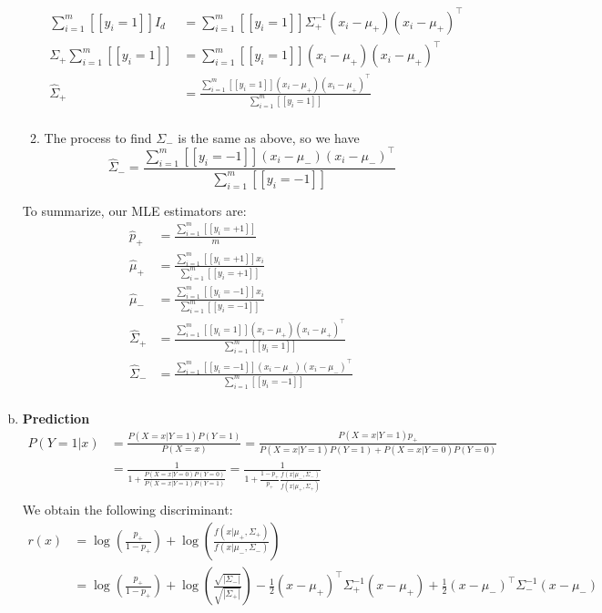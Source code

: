 \documentclass{amsart}
\theoremstyle{definition}
\begin{document}
\begin{enumerate}[(a)]
\begin{enumerate}
\begin{align*}
			\sum_{i=1}^{m}[[y_i = 1]]I_d &= \sum_{i=1}^{m} [[y_i = 1]]\Sigma_+^{-1}(x_i - \mu_+) (x_i-\mu_+)^\intercal\\
			\Sigma_+\sum_{i=1}^{m}[[y_i=1]] &= \sum_{i=1}^{m} [[y_i = 1]](x_i - \mu_+) (x_i-\mu_+)^\intercal\\
			\hat{\Sigma}_+ &= \frac{\sum_{i=1}^{m} [[y_i = 1]](x_i - \mu_+) (x_i-\mu_+)^\intercal}{\sum_{i=1}^{m}[[y_i = 1]]}\\
			\end{align*}
			\item The process to find $\Sigma_-$ is the same as above, so we have
			\[\hat{\Sigma}_- = \frac{\sum_{i=1}^{m}[[y_i = -1]] (x_i - \mu_-) (x_i-\mu_-)^\intercal}{\sum_{i=1}^{m}[[y_i = -1]]}\]
        \end{enumerate}
		To summarize, our MLE estimators are:
		\begin{align*}
			\hat{p}_+ &= \frac{\sum_{i=1}^{m}[[y_i = +1]]}{m}\\
			\hat{\mu}_+ &= \frac{\sum_{i=1}^{m}[[y_i = +1]] x_i}{\sum_{i=1}^{m}[[y_i = +1]]}\\
			\hat{\mu}_- &= \frac{\sum_{i=1}^{m}[[y_i = -1]] x_i}{\sum_{i=1}^{m}[[y_i = -1]]}\\
			\hat{\Sigma}_+ &= \frac{\sum_{i=1}^{m} [[y_i = 1]](x_i - \mu_+) (x_i-\mu_+)^\intercal}{\sum_{i=1}^{m}[[y_i = 1]]}\\
			\hat{\Sigma}_- &= \frac{\sum_{i=1}^{m}[[y_i = -1]] (x_i - \mu_-) (x_i-\mu_-)^\intercal}{\sum_{i=1}^{m}[[y_i = -1]]}\\
		\end{align*}
	\item {\bf Prediction}
		\begin{align*}
			P(Y = 1|x) &= \frac{P(X = x| Y= 1)P(Y=1)}{P(X = x)} = \frac{P(X = x|Y=1)p_+}{P(X=x|Y = 1)P(Y=1) + P(X = x|Y = 0)P(Y = 0)}\\
			&= \frac{1}{1 + \frac{P(X = x| Y = 0)P(Y = 0)}{P(X=x|Y=1)P(Y = 1)}} = \frac{1}{1 + \frac{1-p_+}{p_+}\frac{f(x|\mu_-, \Sigma_-)}{f(x|\mu_+, \Sigma_+)}}\\
		\end{align*}
		We obtain the following discriminant:
		\begin{align*}
			r(x) &= \log\left(\frac{p_+}{1-p_+}\right) + \log\left(\frac{f(x|\mu_+, \Sigma_+)}{f(x|\mu_-, \Sigma_-)}\right) \\
			&= \log\left(\frac{p_+}{1-p_+}\right) + \log\left(\frac{\sqrt{|\Sigma_-|}}{\sqrt{|\Sigma_+|}} \right) -\frac{1}{2}(x - \mu_+)^\intercal \Sigma_+^{-1}(x - \mu_+) + \frac12(x - \mu_-)^\intercal \Sigma_-^{-1}(x - \mu_-) \\ 

\end{align*}
\end{enumerate}
\end{document}
